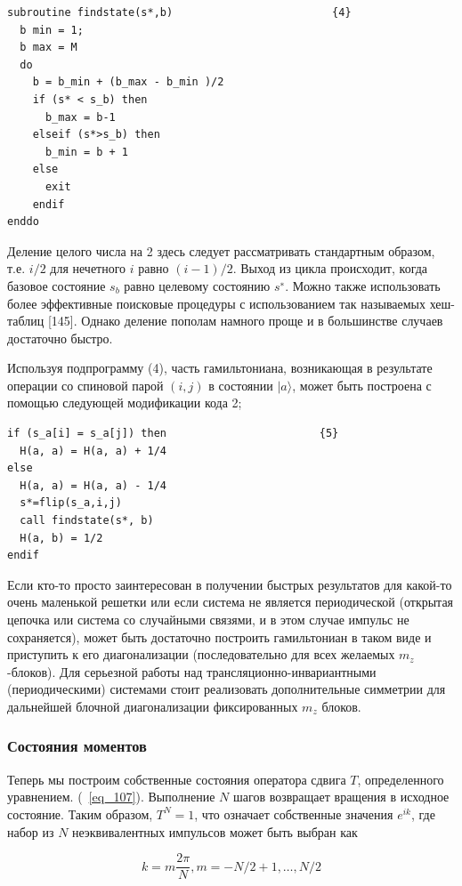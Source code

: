 \documentclass[11pt]{article}
\begin{document}
\begin{lstlisting}
subroutine findstate(s*,b)                         {4}
  b min = 1; 
  b max = M
  do
    b = b_min + (b_max - b_min )/2
    if (s* < s_b) then
      b_max = b-1
    elseif (s*>s_b) then
      b_min = b + 1
    else
      exit
    endif
enddo
\end{lstlisting}

Деление целого числа на 2 здесь следует рассматривать стандартным образом, т.е. $i / 2$ для нечетного $i$ равно $(i - 1) / 2$. Выход из цикла происходит, когда базовое состояние $s_b$ равно целевому состоянию $s^∗$. Можно также использовать более эффективные поисковые процедуры с использованием так называемых хеш-таблиц [145]. Однако деление пополам намного проще и в большинстве случаев достаточно быстро.

Используя подпрограмму (4), часть гамильтониана, возникающая в результате операции со спиновой парой $(i, j)$ в состоянии $| a \rangle$, может быть построена с помощью следующей модификации кода {2};

\begin{lstlisting}
if (s_a[i] = s_a[j]) then                        {5}
  H(a, a) = H(a, a) + 1/4
else
  H(a, a) = H(a, a) - 1/4
  s*=flip(s_a,i,j)
  call findstate(s*, b)
  H(a, b) = 1/2
endif
\end{lstlisting}

Если кто-то просто заинтересован в получении быстрых результатов для какой-то очень маленькой решетки или если система не является периодической (открытая цепочка или система со случайными связями, и в этом случае импульс не сохраняется), может быть достаточно построить гамильтониан в таком виде и приступить к его диагонализации (последовательно для всех желаемых $m_z$ -блоков). Для серьезной работы над трансляционно-инвариантными (периодическими) системами стоит реализовать дополнительные симметрии для дальнейшей блочной диагонализации фиксированных $m_z$ блоков.

\subsubsection{Состояния моментов}
Теперь мы построим собственные состояния оператора сдвига $T$, определенного уравнением. (~\ref{eq_107}). Выполнение $N$ шагов возвращает вращения в исходное состояние. Таким образом, $T^N = 1$, что означает собственные значения $e^{ik}$, где набор из $N$ неэквивалентных импульсов может быть выбран как

\begin{equation}
k=m\frac{2\pi}{N}, m = -N/2+1,\dots,N/2
\label{eq_114}
\end{equation}
\end{document}
